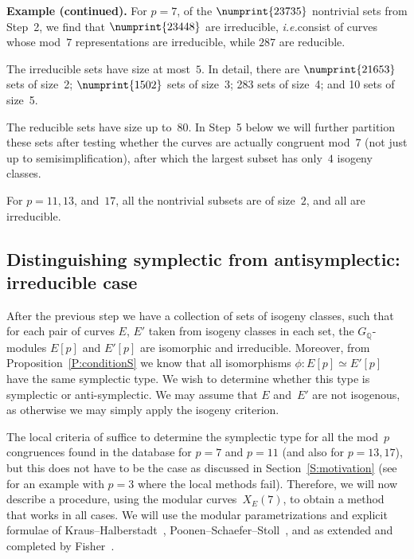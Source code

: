 \documentclass[12pt, reqno]{amsart}
\newcommand{\Q}{\mathbb{Q}}
\numberwithin{equation}{section}
\theoremstyle{definition}
\theoremstyle{remark}
\begin{document}
{\bf Example (continued).} For $p=7$, of the $\numprint{23735}$
nontrivial sets from Step~2, we find that $\numprint{23448}$ are
irreducible, {\it i.e.}\@ consist of curves whose mod~$7$
representations are irreducible, while $287$ are reducible.

The irreducible sets have size at most~$5$.  In detail, there are
$\numprint{21653}$ sets of size~2; $\numprint{1502}$ sets of size~3;
283 sets of size~4; and 10 sets of size~5.

The reducible sets have size up to~$80$.  In Step~5 below we will further
partition these sets after testing whether the curves are actually congruent
mod~7 (not just up to semisimplification), after which the largest subset has
only~$4$ isogeny classes.


For $p=11, 13$, and~$17$, all the nontrivial subsets are of size~$2$,
and all are irreducible.


\subsection{Distinguishing symplectic from antisymplectic: irreducible case}
After the previous step we have a collection of sets of isogeny
classes, such that for each pair of curves $E$, $E'$ taken from
isogeny classes in each set, the $G_{\Q}$-modules $E[p]$ and $E'[p]$
are isomorphic and irreducible. Moreover, from
Proposition~\ref{P:conditionS} we know that all isomorphisms $\phi : E[p]
\simeq E'[p]$ have the same symplectic type. We wish to determine
whether this type is symplectic or anti-symplectic.  We may assume
that $E$ and~$E'$ are not isogenous, as otherwise we may simply apply
the isogeny criterion.

The local criteria of \cite{FKSym} suffice to determine the symplectic
type for all the mod~$p$ congruences found in the database for $p=7$
and $p=11$ (and also for $p=13, 17$), but this does not have to be
the case as discussed in Section~\ref{S:motivation} (see
\cite[Proposition~16]{FKSym} for an example with $p=3$ where the local
methods fail).  Therefore, we will now describe a procedure, using the
modular curves~$X_E(7)$, to obtain a method that works in all cases.
We will use the modular parametrizations and explicit formulae of
Kraus--Halberstadt~\cite{Halberstadt-Kraus-XE7},
Poonen--Schaefer--Stoll~\cite{PSS}, and as extended and completed by
Fisher~\cite{Fisher}.
\end{document}

